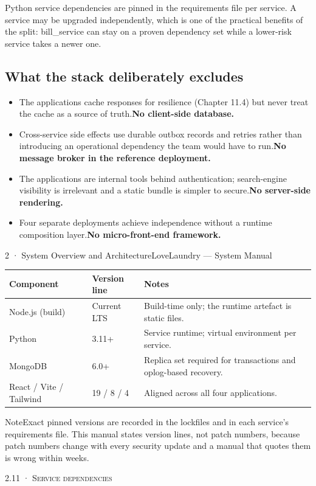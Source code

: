 \documentclass[11pt,a4paper,oneside]{book}
\begin{document}
Python service dependencies are pinned in the requirements file per service. A service may be upgraded independently, which is one of the practical benefits of the split: bill\_service can stay on a proven dependency set while a lower-risk service takes a newer one.

\subsection*{What the stack deliberately excludes}
\begin{itemize}
\item The applications cache responses for resilience (Chapter 11.4) but never treat the cache as a source of truth.\textbf{No client-side database.}
\item Cross-service side effects use durable outbox records and retries rather than introducing an operational dependency the team would have to run.\textbf{No message broker in the reference deployment.}
\item The applications are internal tools behind authentication; search-engine visibility is irrelevant and a static bundle is simpler to secure.\textbf{No server-side rendering.}
\item Four separate deployments achieve independence without a runtime composition layer.\textbf{No micro-front-end framework.}
\end{itemize}
2 · System Overview and ArchitectureLoveLaundry — System Manual

\begin{center}\small
\begin{tabularx}{\linewidth}{|X|X|X|}
\hline
\rowcolor{lightgrey}
\textbf{Component} & \textbf{Version line} & \textbf{Notes} \\ \hline
Node.js (build) & Current LTS & Build-time only; the runtime artefact is static files. \\ \hline
Python & 3.11+ & Service runtime; virtual environment per service. \\ \hline
MongoDB & 6.0+ & Replica set required for transactions and oplog-based recovery. \\ \hline
React / Vite / Tailwind & 19 / 8 / 4 & Aligned across all four applications. \\ \hline
\end{tabularx}
\end{center}
\begin{notebox}NoteExact pinned versions are recorded in the lockfiles and in each service's requirements file. This manual states version lines, not patch numbers, because patch numbers change with every security update and a manual that quotes them is wrong within weeks.\end{notebox}
\textsc{\small\color{crimson}2.11 · Service dependencies}\par\medskip
\end{document}
